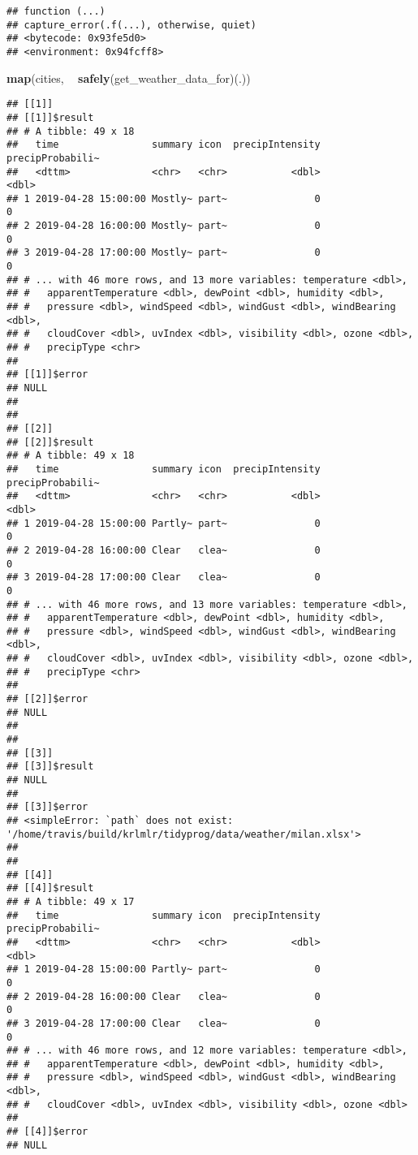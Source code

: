 \documentclass[]{book}
\newenvironment{Shaded}{\begin{snugshade}}{\end{snugshade}}
\newcommand{\KeywordTok}[1]{\textcolor[rgb]{0.13,0.29,0.53}{\textbf{#1}}}
\newcommand{\NormalTok}[1]{#1}
\newcommand{\OperatorTok}[1]{\textcolor[rgb]{0.81,0.36,0.00}{\textbf{#1}}}
\newcommand{\StringTok}[1]{\textcolor[rgb]{0.31,0.60,0.02}{#1}}
\begin{document}
\begin{verbatim}
## function (...) 
## capture_error(.f(...), otherwise, quiet)
## <bytecode: 0x93fe5d0>
## <environment: 0x94fcff8>
\end{verbatim}

\begin{Shaded}
\begin{Highlighting}[]
\KeywordTok{map}\NormalTok{(cities, }\OperatorTok{~}\StringTok{ }\KeywordTok{safely}\NormalTok{(get_weather_data_for)(.))}
\end{Highlighting}
\end{Shaded}

\begin{verbatim}
## [[1]]
## [[1]]$result
## # A tibble: 49 x 18
##   time                summary icon  precipIntensity precipProbabili~
##   <dttm>              <chr>   <chr>           <dbl>            <dbl>
## 1 2019-04-28 15:00:00 Mostly~ part~               0                0
## 2 2019-04-28 16:00:00 Mostly~ part~               0                0
## 3 2019-04-28 17:00:00 Mostly~ part~               0                0
## # ... with 46 more rows, and 13 more variables: temperature <dbl>,
## #   apparentTemperature <dbl>, dewPoint <dbl>, humidity <dbl>,
## #   pressure <dbl>, windSpeed <dbl>, windGust <dbl>, windBearing <dbl>,
## #   cloudCover <dbl>, uvIndex <dbl>, visibility <dbl>, ozone <dbl>,
## #   precipType <chr>
## 
## [[1]]$error
## NULL
## 
## 
## [[2]]
## [[2]]$result
## # A tibble: 49 x 18
##   time                summary icon  precipIntensity precipProbabili~
##   <dttm>              <chr>   <chr>           <dbl>            <dbl>
## 1 2019-04-28 15:00:00 Partly~ part~               0                0
## 2 2019-04-28 16:00:00 Clear   clea~               0                0
## 3 2019-04-28 17:00:00 Clear   clea~               0                0
## # ... with 46 more rows, and 13 more variables: temperature <dbl>,
## #   apparentTemperature <dbl>, dewPoint <dbl>, humidity <dbl>,
## #   pressure <dbl>, windSpeed <dbl>, windGust <dbl>, windBearing <dbl>,
## #   cloudCover <dbl>, uvIndex <dbl>, visibility <dbl>, ozone <dbl>,
## #   precipType <chr>
## 
## [[2]]$error
## NULL
## 
## 
## [[3]]
## [[3]]$result
## NULL
## 
## [[3]]$error
## <simpleError: `path` does not exist: '/home/travis/build/krlmlr/tidyprog/data/weather/milan.xlsx'>
## 
## 
## [[4]]
## [[4]]$result
## # A tibble: 49 x 17
##   time                summary icon  precipIntensity precipProbabili~
##   <dttm>              <chr>   <chr>           <dbl>            <dbl>
## 1 2019-04-28 15:00:00 Partly~ part~               0                0
## 2 2019-04-28 16:00:00 Clear   clea~               0                0
## 3 2019-04-28 17:00:00 Clear   clea~               0                0
## # ... with 46 more rows, and 12 more variables: temperature <dbl>,
## #   apparentTemperature <dbl>, dewPoint <dbl>, humidity <dbl>,
## #   pressure <dbl>, windSpeed <dbl>, windGust <dbl>, windBearing <dbl>,
## #   cloudCover <dbl>, uvIndex <dbl>, visibility <dbl>, ozone <dbl>
## 
## [[4]]$error
## NULL
\end{verbatim}
\end{document}

